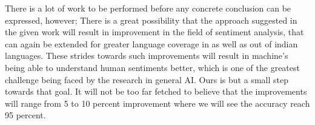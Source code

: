 \documentclass[conference]{IEEEtran}
\begin{document}
There is a lot of work to be performed before any concrete conclusion can be
expressed, however; There is a great possibility that the approach suggested in
the given work will result in improvement in the field of sentiment analysis,
that can again be extended for greater language coverage in as well as out of
indian languages. These strides towards such improvements will result in
machine's being able to understand human sentiments better, which is one of the
greatest challenge being faced by the research in general AI. Ours is but a
small step towards that goal. It will not be too far fetched to believe that
the improvements will range from 5 to 10 percent improvement where we will see
the accuracy reach 95 percent. \\













%
%
%



%
%
\printbibliography


\end{document}
